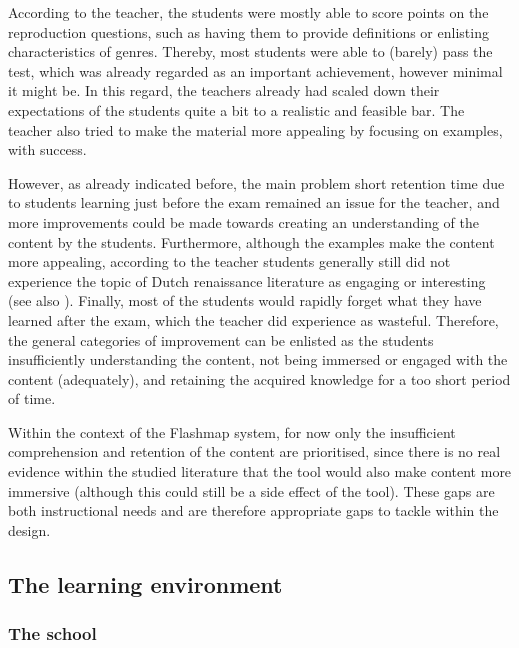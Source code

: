According to the teacher, the students were mostly able to score points on the reproduction questions, such as having them to provide definitions or enlisting characteristics of genres. Thereby, most students were able to (barely) pass the test, which was already regarded as an important achievement, however minimal it might be. In this regard, the teachers already had scaled down their expectations of the students quite a bit to a realistic and feasible bar. The teacher also tried to make the material more appealing by focusing on examples, with success.

However, as already indicated before, the main problem short retention time due to students learning just before the exam remained an issue for the teacher, and more improvements could be made towards creating an understanding of the content by the students. Furthermore, although the examples make the content more appealing, according to the teacher students generally still did not experience the topic of Dutch renaissance literature as engaging or interesting (see also ). Finally, most of the students would rapidly forget what they have learned after the exam, which the teacher did experience as wasteful. Therefore, the general categories of improvement can be enlisted as the students insufficiently understanding the content, not being immersed or engaged with the content (adequately), and retaining the acquired knowledge for a too short period of time.

Within the context of the Flashmap system, for now only the insufficient comprehension and retention of the content are prioritised, since there is no real evidence within the studied literature that the tool would also make content more immersive (although this could still be a side effect of the tool). These gaps are both instructional needs and are therefore appropriate gaps to tackle within the design.

\subsection{The learning environment}

\subsubsection{The school}

